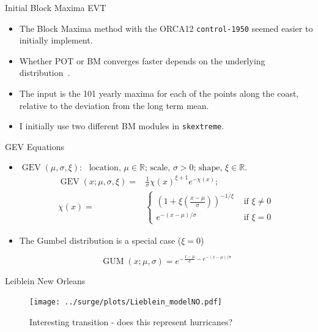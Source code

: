 \begin{frame}{Initial Block Maxima EVT }
\begin{itemize}
    \item The Block Maxima method with the ORCA12
    \texttt{control-1950} seemed easier to initially implement.
    \item Whether POT or BM converges faster depends
          on the underlying distribution~\cite{bucher2018horse}.
    \item The input is the 101 yearly maxima for each of the points along the coast,
         relative to the deviation from the long term mean.
    \item I initially use two different BM modules in \texttt{skextreme}.
    \end{itemize}
    \end{frame}
    \begin{frame}{GEV Equations }
    \begin{itemize}
\item
\(
\operatorname{GEV}(\mu, \sigma, \xi):
\)
\(
\text{ location, } \mu \in \mathbb{R}
\text{; scale, } \sigma>0
\text{; shape, } \xi \in \mathbb{R}.
\)
\begin{eqnarray}
\operatorname{GEV}(x; \mu, \sigma, \xi)=&
\frac{1}{\sigma} \chi(x)^{\xi+1} e^{-\chi(x)};\\
\chi(x)=&\left\{\begin{array}{ll}
\left(1+\xi\left(\frac{x-\mu}{\sigma}\right)\right)^{-1 / \xi} & \text { if } \xi \neq 0 \\
e^{-(x-\mu) / \sigma} & \text { if } \xi=0
\end{array}\right.
\end{eqnarray}
\item The Gumbel distribution is a special case ($\xi=0$)

\begin{equation} \operatorname{GUM}(x ; \mu, \sigma)=e^{-\frac{x-\mu}{\sigma}-e^{-(x-\mu) / \sigma}}
\end{equation}
\end{itemize}
\end{frame}


\begin{frame}{Leiblein New Orleans}
\vspace{-20pt}
 \begin{minipage}{1.0\textwidth}
\begin{figure}[htb!]
    \centering
    \texttt{[image: ../surge/plots/Lieblein\_modelNO.pdf]}
    \vspace{-15pt}
   \caption{Interesting transition - does this represent hurricanes? }
    \label{fig:}
\end{figure}
\end{minipage}
\end{frame}


